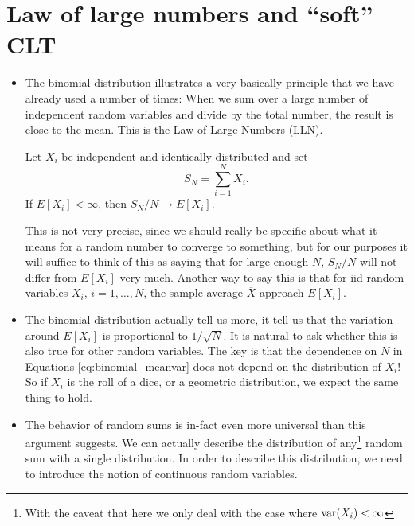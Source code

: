 % 


 \section{Law of large numbers and ``soft'' CLT}
 
 \begin{itemize}
 \item The binomial distribution illustrates a very basically principle that we have already used a number of times: When we sum over a large number of independent random variables and divide by the total number, the result is close to the mean. This is the Law of Large Numbers (LLN). 
 \begin{thm} Let $X_i$ be independent and identically distributed and set
 \begin{equation*}
 S_N = \sum_{i=1}^N X_i.
 \end{equation*}
 If $E[X_i]<\infty$, then $S_N/N \to E[X_i]$. 
 \end{thm}
 This is not very precise, since we should really be specific about what it means for a random number to converge to something, but for our purposes it will suffice to think of this as saying that for large enough $N$, $S_N/N$ will not differ from $E[X_i]$ very much. Another way to say this is that for iid random variables $X_i$, $i=1,\dots,N$, the sample average $\overline{X}$ approach $E[X_i]$. 
 \item The binomial distribution actually tell us more, it tell us that the variation around $E[X_i]$ is proportional to $1/\sqrt{N}$. It is natural to ask whether this is also true for other random variables. The key is that the dependence on $N$ in Equations \ref{eq:binomial_meanvar} does not depend on the distribution of $X_i$! So if $X_i$ is the roll of a dice, or a geometric distribution, we expect the same thing to hold. 
\item  The behavior of random sums is in-fact even more universal than this argument suggests. We can actually describe the distribution of any\footnote{With the caveat that here we only deal with the case where ${\rm var}(X_i)<\infty$} random sum with a single distribution.  In order to describe this distribution, we need to introduce the notion of continuous random variables. 
 \end{itemize}

